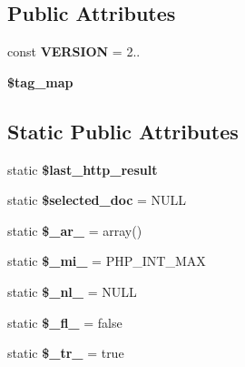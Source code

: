 \subsection*{Public Attributes}
\begin{DoxyCompactItemize}
\item 
\mbox{\label{classduzun_1_1hQuery_1_1Node_a26a33c519d62ecc351029fdad22038fd}} 
const {\bfseries V\+E\+R\+S\+I\+ON} = \textquotesingle{}2..\textquotesingle{}
\item 
\mbox{\label{classduzun_1_1hQuery_1_1Node_a33c8622004dbbf3723c5c4af914f398e}} 
{\bfseries \$tag\+\_\+map}
\end{DoxyCompactItemize}
\subsection*{Static Public Attributes}
\begin{DoxyCompactItemize}
\item 
\mbox{\label{classduzun_1_1hQuery_1_1Node_abca222acf298392097808df6ba2ec539}} 
static {\bfseries \$last\+\_\+http\+\_\+result}
\item 
\mbox{\label{classduzun_1_1hQuery_1_1Node_a4fc24bd52aefff699526b031f1c579cf}} 
static {\bfseries \$selected\+\_\+doc} = N\+U\+LL
\item 
\mbox{\label{classduzun_1_1hQuery_1_1Node_a8ed033358ffe33f07aa5a051379d7e71}} 
static {\bfseries \$\+\_\+ar\+\_\+} = array()
\item 
\mbox{\label{classduzun_1_1hQuery_1_1Node_ada2519db2120cc197d7dd5b1435d1727}} 
static {\bfseries \$\+\_\+mi\+\_\+} = P\+H\+P\+\_\+\+I\+N\+T\+\_\+\+M\+AX
\item 
\mbox{\label{classduzun_1_1hQuery_1_1Node_acf39e90dde140c9a6fd672fb75c5df0c}} 
static {\bfseries \$\+\_\+nl\+\_\+} = N\+U\+LL
\item 
\mbox{\label{classduzun_1_1hQuery_1_1Node_ab4aa94aeeb92d7ff8047b6d4401b0bc4}} 
static {\bfseries \$\+\_\+fl\+\_\+} = false
\item 
\mbox{\label{classduzun_1_1hQuery_1_1Node_a8dc30378dc26cb361f9496fe0f495d84}} 
static {\bfseries \$\+\_\+tr\+\_\+} = true
\end{DoxyCompactItemize}

